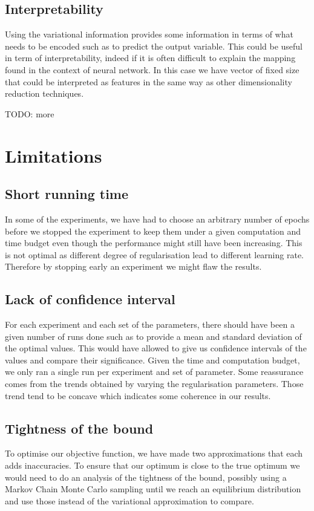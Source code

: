\documentclass[11pt,oneside,openright]{report}
\begin{document}
\subsection{Interpretability}
Using the variational information provides some information in terms of what needs to be encoded such as to predict the output variable. This could be useful in term of interpretability, indeed if it is often difficult to explain the mapping found in the context of neural network. In this case we have vector of fixed size that could be interpreted as features in the same way as other dimensionality reduction techniques.

TODO: more
\section{Limitations}
\subsection{Short running time}
In some of the experiments, we have had to choose an arbitrary number of epochs before we stopped the experiment to keep them under a given computation and time budget even though the performance might still have been increasing. This is not optimal as different degree of regularisation lead to different learning rate. Therefore by stopping early an experiment we might flaw the results.

\subsection{Lack of confidence interval}
For each experiment and each set of the parameters, there should have been a given number of runs done such as to provide a mean and standard deviation of the optimal values. This would have allowed to give us confidence intervals of the values and compare their significance. Given the time and computation budget, we only ran a single run per experiment and set of parameter. Some reassurance comes from the trends obtained by varying the regularisation parameters. Those trend tend to be concave which indicates some coherence in our results. 

\subsection{Tightness of the bound}
To optimise our objective function, we have made two approximations that each adds inaccuracies. To ensure that our optimum is close to the true optimum we would need to do an analysis of the tightness of the bound, possibly using a Markov Chain Monte Carlo sampling until we reach an equilibrium distribution and use those instead of the variational approximation to compare.
\end{document}
